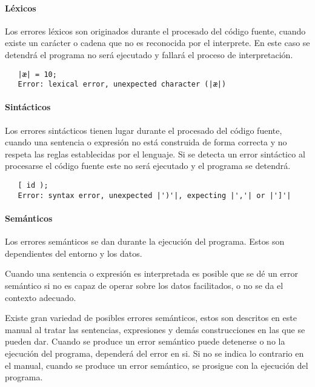 \paragraph {Léxicos} 
Los errores léxicos son originados durante el procesado del código fuente, cuando existe un carácter o cadena que no es reconocida por el interprete. En este caso 
se detendrá el programa no será ejecutado y fallará el proceso de interpretación. \\

\begin{lstlisting}
   |æ| = 10;
   Error: lexical error, unexpected character (|æ|)
\end{lstlisting}

\paragraph {Sintácticos}
Los errores sintácticos tienen lugar durante el procesado del código fuente, cuando una sentencia o expresión no está construida de forma correcta y no respeta las reglas establecidas por el 
lenguaje. Si se detecta un error sintáctico al procesarse el código fuente este no será ejecutado y el programa se detendrá. \\

\begin{lstlisting}
   [ id );
   Error: syntax error, unexpected |')'|, expecting |','| or |']'|
\end{lstlisting}

\paragraph {Semánticos} 
Los errores semánticos se dan durante la ejecución del programa. Estos son dependientes del entorno y los datos. 

Cuando una sentencia o expresión es interpretada es posible que se dé un error semántico si no es capaz de operar sobre los datos
facilitados, o no se da el contexto adecuado. 

Existe gran variedad de posibles errores semánticos, estos son descritos en este manual al tratar las sentencias, expresiones y demás construcciones en las que se 
pueden dar. Cuando se produce un error semántico puede detenerse o no la ejecución del programa, dependerá del error en si. Si no se indica lo contrario en
el manual, cuando se produce un error semántico, se prosigue con la ejecución del programa. \\


